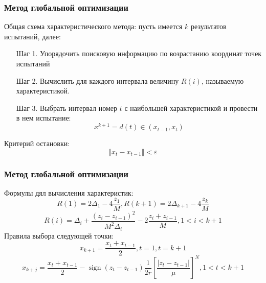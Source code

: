 \documentclass[aspectratio=1610]{beamer}
\DeclareMathOperator{\sign}{sign}
\begin{document}
\begin{frame}
  \frametitle{Метод глобальной оптимизации}
  Общая схема характеристического метода:
  пусть имеется \(k\) результатов испытаний, далее:
  \begin{enumerate}
    \setlength{\itemindent}{.1in}
    \item[Шаг 1.] Упорядочить поисковую информацию по возрастанию
    координат точек испытаний
    \item[Шаг 2.] Вычислить для каждого интервала
    величину \(R(i)\), называемую характеристикой.
    \item[Шаг 3.] Выбрать интервал номер \(t\) с наибольшей
    характеристикой и провести в нем испытание:
    \begin{displaymath}
      x^{k+1}=d(t)\in (x_{t-1}, x_t)
    \end{displaymath}
  \end{enumerate}

  Критерий остановки:
  \begin{displaymath}
    \Vert x_t - x_{t-1}\Vert < \varepsilon
  \end{displaymath}
\end{frame}

\begin{frame}
  \frametitle{Метод глобальной оптимизации}
  Формулы дял вычисления характеристик:
  \begin{displaymath}
    R(1)=2\Delta_1-4\dfrac{z_1}{M},R(k+1)=2\Delta_{k+1}-4\dfrac{z_k}{M}
  \end{displaymath}
  \begin{displaymath}
    R(i)=\Delta_i+\dfrac{(z_i-z_{i-1})^2}{M^2\Delta_i}-2\dfrac{z_i+z_{i-1}}{M},1<i<k+1
  \end{displaymath}
  Правила выбора следующей точки:
  \begin{displaymath}
    x_{k+1}=\dfrac{x_{t}+x_{t-1}}{2},t=1,t=k+1
  \end{displaymath}
  \begin{displaymath}
    x_{k+j}=\dfrac{x_{t}+x_{t-1}}{2}-\sign(z_{t}-z_{t-1})\dfrac{1}{2r}\left[\dfrac{|z_{t}-z_{t-1}|}{\mu}\right]^N,1<t<k+1
  \end{displaymath}
\end{frame}
\end{document}
